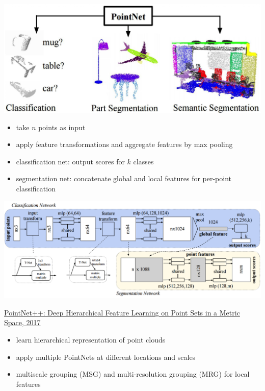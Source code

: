 \begin{center}
    \includegraphics[width=0.8\columnwidth]{images/pointnet_application.jpeg}
    \label{fig:pointnet_application}
\end{center}

\begin{itemize}
    \item take $n$ points as input
    \item apply feature transformations and aggregate features by max pooling
    \item classification net: output scores for $k$ classes
    \item segmentation net: concatenate global and local features for per-point classification
\end{itemize}
\begin{center}
    \includegraphics[width=\columnwidth]{images/pointnet_architecture.jpeg}
    \label{fig:pointnet_architecture}
\end{center}

\href{https://arxiv.org/pdf/1706.02413}{PointNet++: Deep Hierarchical Feature Learning on
Point Sets in a Metric Space, 2017}
    
\begin{itemize}
    \item learn hierarchical representation of point clouds
    \item apply multiple PointNets at different locations and scales
    \item multiscale grouping (MSG) and multi-resolution grouping (MRG) for local features
\end{itemize}


